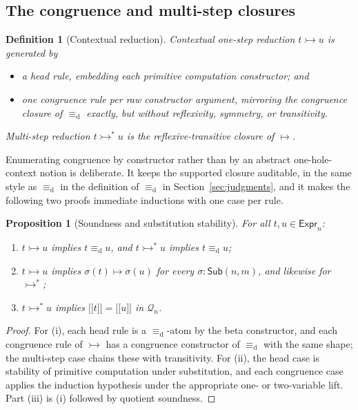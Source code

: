 \documentclass[10pt,reqno]{amsart}
\newtheorem{proposition}[theorem]{Proposition}
\newtheorem{definition}[theorem]{Definition}
\newcommand{\Expr}{\mathsf{Expr}}
\newcommand{\Sub}{\mathsf{Sub}}
\newcommand{\den}[1]{\mathopen{\lbrack\!\lbrack}#1\mathclose{\rbrack\!\rbrack}}
\newcommand{\defeq}{\mathrel{\equiv_{\mathrm d}}}
\newcommand{\red}{\mathrel{\longmapsto}}
\newcommand{\ctxred}{\mathrel{\rightarrowtail}}
\newcommand{\ctxredstar}{\mathrel{\rightarrowtail^{*}}}
\newcommand{\Q}{\mathcal{Q}}
\begin{document}
\subsection{The congruence and multi-step closures}

\begin{definition}[Contextual reduction]
\label{def:contextual-reduction}
Contextual one-step reduction \(t\ctxred u\) is generated by
\begin{itemize}[leftmargin=1.4em]
\item a head rule, embedding each primitive computation constructor; and
\item one congruence rule per raw constructor argument, mirroring the
  congruence closure of \(\defeq\) exactly, but without reflexivity, symmetry,
  or transitivity.
\end{itemize}
Multi-step reduction \(t\ctxredstar{}u\) is the reflexive-transitive closure of
\(\red\).
\end{definition}

Enumerating congruence by constructor rather than by an abstract
one-hole-context notion is deliberate.  It keeps the supported closure
auditable, in the same style as \(\defeq\) in
the definition of \(\defeq\) in Section~\ref{sec:judgments}, and it makes the following two proofs immediate
inductions with one case per rule.

\begin{proposition}[Soundness and substitution stability]
\label{prop:reduction-basic}
For all \(t,u\in\Expr_n\):
\begin{enumerate}[label=(\roman*)]
\item \(t\ctxred u\) implies \(t\defeq u\), and \(t\ctxredstar{}u\) implies
  \(t\defeq u\);
\item \(t\ctxred u\) implies \(\sigma(t)\red\sigma(u)\) for every
  \(\sigma:\Sub(n,m)\), and likewise for \(\ctxredstar\);
\item \(t\ctxredstar{}u\) implies \(\den t=\den u\) in \(\Q_n\).
\end{enumerate}
\end{proposition}

\begin{proof}
For (i), each head rule is a \(\defeq\)-atom by the beta constructor, and each
congruence rule of \(\ctxred\) has a congruence constructor of \(\defeq\) with
the same shape; the multi-step case chains these with transitivity.  For (ii),
the head case is stability of primitive computation under substitution, and
each congruence case applies the induction hypothesis under the appropriate
one- or two-variable lift.  Part (iii) is (i) followed by quotient soundness.
\end{proof}
\end{document}
